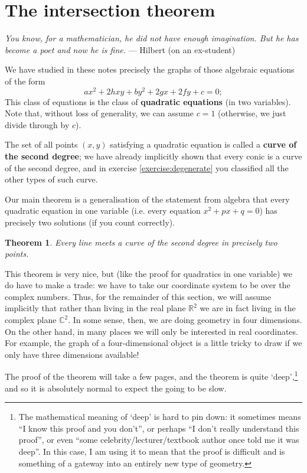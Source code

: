 \documentclass[a4paper,leqno,10pt]{article}
\theoremstyle{exercise}
\theoremstyle{plain}
\newtheorem*{thm}{Theorem}
\theoremstyle{definition}
\theoremstyle{remark}
\newcommand{\df}{\textbf}
\begin{document}
\section{The intersection theorem}
\begin{center}
  \emph{You know, for a mathematician, he did not have enough imagination. But he has become a poet and now he is fine.} --- Hilbert (on an ex-student)
\end{center}
We have studied in these notes precisely the graphs of those algebraic equations of the form
\begin{equation}\label{eqn:prototype}
  ax^2 + 2hxy + by^2 + 2gx + 2fy + c = 0;
\end{equation}
This class of equations is the class of \df{quadratic equations} (in two variables). Note that, without loss
of generality, we can assume $ c = 1 $ (otherwise, we just divide through by $ c $).

The set of all points $ (x,y) $ satisfying a quadratic equation is called a \df{curve of the second degree}; we
have already implicitly shown that every conic is a curve of the second degree, and in exercise \ref{exercise:degenerate}
you classified all the other types of such curve.

Our main theorem is a generalisation of the statement from algebra that every quadratic equation in one variable
(i.e. every equation $ x^2 + px + q = 0 $) has precisely two solutions (if you count correctly).
\begin{thm}\label{thm:funthmquad}
  Every line meets a curve of the second degree in precisely two points.
\end{thm}

This theorem is very nice, but (like the proof for quadratics in one variable) we do have to make a trade:
we have to take our coordinate system to be over the complex numbers. Thus, for the remainder of this section,
we will assume implicitly that rather than living in the real plane $ \mathbb{R}^2 $ we are in fact living
in the complex plane $ \mathbb{C}^2 $. In some sense, then, we are doing geometry in four dimensions. On the
other hand, in many places we will only be interested in real coordinates. For example, the graph of a four-dimensional
object is a little tricky to draw if we only have three dimensions available!

The proof of the theorem will take a few pages, and the theorem is quite `deep',\footnote{The mathematical meaning of `deep' is hard to pin down: it sometimes
means ``I know this proof and you don't'', or perhaps ``I don't really understand this proof'', or even ``some celebrity/lecturer/textbook author once
told me it was deep''. In this case, I am using it to mean that the proof is difficult and is something of a gateway into an entirely new type of geometry.}
and so it is absolutely normal to expect the going to be slow.
\end{document}
